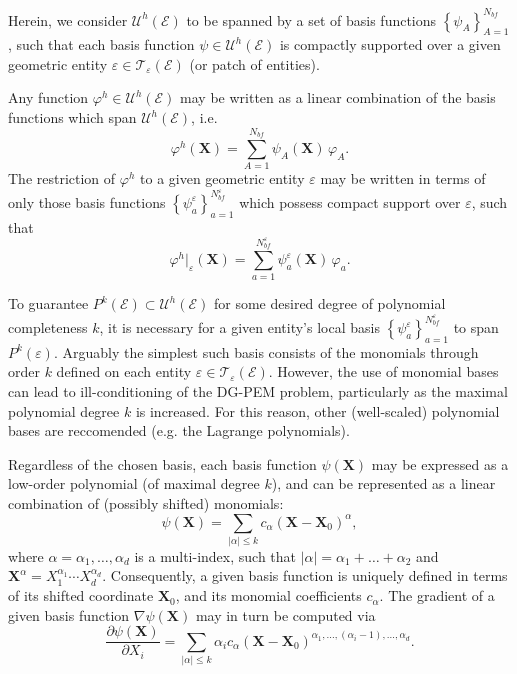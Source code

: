 		Herein, we consider $\mathcal{U}^h (\mathcal{E})$ to be spanned by a set of basis functions $\left\{ \psi_A \right\}_{A=1}^{N_{bf}}$, such that each basis function $\psi \in \mathcal{U}^h (\mathcal{E})$ is compactly supported over a given geometric entity $\varepsilon \in \mathcal{T}_\varepsilon (\mathcal{E})$ (or patch of entities).
		
		Any function $\varphi^h \in \mathcal{U}^h (\mathcal{E})$ may be written as a linear combination of the basis functions which span $\mathcal{U}^h (\mathcal{E})$, i.e.
		\begin{equation}
			\varphi^h (\mathbf{X}) = \sum_{A=1}^{N_{bf}} \psi_A (\mathbf{X}) \, \varphi_A.
		\end{equation}
		The restriction of $\varphi^h$ to a given geometric entity $\varepsilon$ may be written in terms of only those basis functions $\left\{ \psi^\varepsilon_a \right\}_{a=1}^{N^\varepsilon_{bf}}$ which possess compact support over $\varepsilon$, such that
		\begin{equation}
			\varphi^h|_\varepsilon (\mathbf{X}) = \sum_{a=1}^{N^\varepsilon_{bf}} \psi^\varepsilon_a (\mathbf{X}) \, \varphi_a.
		\end{equation}
		
		To guarantee $P^k (\mathcal{E}) \subset \mathcal{U}^h (\mathcal{E})$ for some desired degree of polynomial completeness $k$, it is necessary for a given entity's local basis $\left\{ \psi^\varepsilon_a \right\}_{a=1}^{N^\varepsilon_{bf}}$ to span $P^k (\varepsilon)$. Arguably the simplest such basis consists of the monomials through order $k$ defined on each entity $\varepsilon \in \mathcal{T}_\varepsilon (\mathcal{E})$. However, the use of monomial bases can lead to ill-conditioning of the DG-PEM problem, particularly as the maximal polynomial degree $k$ is increased. For this reason, other (well-scaled) polynomial bases are reccomended (e.g. the Lagrange polynomials).
		
		Regardless of the chosen basis, each basis function $\psi (\mathbf{X})$ may be expressed as a low-order polynomial (of maximal degree $k$), and can be represented as a linear combination of (possibly shifted) monomials:
		\begin{equation}
			\psi (\mathbf{X}) = \sum_{|\alpha| \leq k} c_\alpha (\mathbf{X}-\mathbf{X}_0)^{\alpha},
		\end{equation}
		where $\alpha = \alpha_1, \ldots, \alpha_d$ is a multi-index, such that $|\alpha| = \alpha_1 + \ldots + \alpha_2$ and $\mathbf{X}^\alpha = X_1^{\alpha_1} \cdots X_d^{\alpha_d}$. Consequently, a given basis function is uniquely defined in terms of its shifted coordinate $\mathbf{X}_0$, and its monomial coefficients $c_\alpha$. The gradient of a given basis function $\nabla \psi (\mathbf{X})$ may in turn be computed via
		\begin{equation}
			\frac{\partial \psi (\mathbf{X})}{\partial X_i} = \sum_{|\alpha| \leq k} \alpha_i c_\alpha (\mathbf{X}-\mathbf{X}_0)^{\alpha_1, \ldots, (\alpha_i - 1), \ldots, \alpha_d}.
		\end{equation}
		
